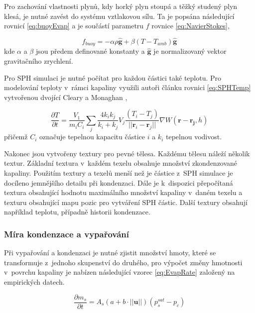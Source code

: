 Pro zachování vlastnosti plynů, kdy horký plyn stoupá a těžký studený plyn klesá, je nutné zavést do systému vztlakovou sílu. Ta je popsána následující rovnicí \ref{eq:buoyEvap} a je součástí parametru $f$ rovnice \ref{eq:NavierStokes},

\begin{equation}
\label{eq:buoyEvap}
	f_{buoy} = -\alpha \rho \hat{\mathbf{g}} + \beta(T - T_{amb})\hat{\mathbf{g}}
\end{equation}
kde $\alpha$ a $\beta$ jsou předem definované konstanty a $\hat{\mathbf{g}}$ je normalizovaný vektor gravitačního zrychlení.

Pro SPH simulaci je nutné počítat pro každou částici také teplotu. Pro modelování teploty v~rámci kapaliny využili autoři článku rovnici \ref{eq:SPHTemp} vytvořenou dvojící Cleary a Monaghan \cite{Cleary99}, 

\begin{equation}
	\frac{\partial T}{\partial t} = \frac{V_1}{m_i C_i} \sum_j \frac{4 k_i k_j}{k_i + k_j} V_j \frac{(T_i - T_j)}{||\mathbf{r}_i - \mathbf{r}_j||}\nabla W(\mathbf{r} - \mathbf{r_j},h)
	\label{eq:SPHTemp}
\end{equation}
přičemž $C_i$ označuje tepelnou kapacitu částice $i$ a $k_i$ tepelnou vodivost.

Nakonec jsou vytvořeny textury pro pevné tělesa. Každému tělesu náleží několik textur. Základní textura v~každém texelu obsahuje množství zkondenzované kapaliny. Použitím textury a texelů menší než je částice z~SPH simulace je docíleno jemnějšího detailu při kondenzaci. Dále je k~dispozici přepočítaná textura obsahující hodnotu maximálního množství kapaliny v~daném texelu a texturu obsahující mapu pozic pro vytváření SPH částic. Další textury obsahují například teplotu, případně historii kondenzace.

\subsubsection{Míra kondenzace a vypařování}
Při vypařování a kondenzaci je nutné zjistit množství hmoty, které se transformuje z~jednoho skupenství do druhého, pro výpočet změny hmotnosti v~povrchu kapaliny je nabízen následující vzorec \ref{eq:EvapRate} založený na empirických datech. \cite{SMITH94}

\begin{equation}
	\frac{\partial m_s}{\partial t} = A_s(a + b \cdot ||\mathbf{u}||)(p_s^{sat} - p_c)
	\label{eq:EvapRate}
\end{equation}

